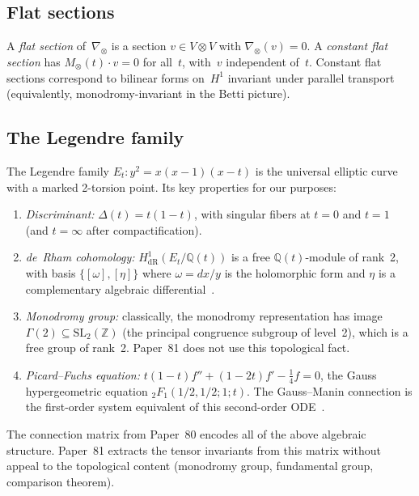 \documentclass[11pt]{article}
\theoremstyle{plain}
\theoremstyle{definition}
\theoremstyle{remark}
\newcommand{\Z}{\mathbb{Z}}
\newcommand{\Q}{\mathbb{Q}}
\newcommand{\HdR}{H^1_{\mathrm{dR}}}
\begin{document}
\subsection{Flat sections}

A \emph{flat section} of~$\nabla_{\otimes}$ is a section
$v \in V \otimes V$ with $\nabla_{\otimes}(v) = 0$.
A \emph{constant flat section} has
$M_{\otimes}(t) \cdot v = 0$ for all~$t$, with~$v$
independent of~$t$.  Constant flat sections correspond to
bilinear forms on~$H^1$ invariant under parallel transport
(equivalently, monodromy-invariant in the Betti picture).

\subsection{The Legendre family}\label{sec:legendre}

The Legendre family $E_t : y^2 = x(x-1)(x-t)$ is the
universal elliptic curve with a marked 2-torsion point.
Its key properties for our purposes:
\begin{enumerate}[nosep]
\item \emph{Discriminant:} $\Delta(t) = t(1-t)$, with
  singular fibers at $t = 0$ and $t = 1$ (and $t = \infty$
  after compactification).
\item \emph{de~Rham cohomology:} $\HdR(E_t/\Q(t))$ is
  a free $\Q(t)$-module of rank~2, with basis
  $\{[\omega], [\eta]\}$ where $\omega = dx/y$ is the
  holomorphic form and $\eta$ is a complementary algebraic
  differential~\cite{Paper80}.
\item \emph{Monodromy group:} classically, the monodromy
  representation has image $\Gamma(2) \subseteq \mathrm{SL}_2(\Z)$
  (the principal congruence subgroup of level~2), which is
  a free group of rank~2.  Paper~81 does not use this
  topological fact.
\item \emph{Picard--Fuchs equation:}
  $t(1-t) f'' + (1-2t) f' - \frac{1}{4} f = 0$,
  the Gauss hypergeometric equation ${}_2F_1(1/2, 1/2; 1; t)$.
  The Gauss--Manin connection is the first-order system
  equivalent of this second-order ODE~\cite{Gauss1812,Katz1970}.
\end{enumerate}
The connection matrix from Paper~80 encodes all of the above
algebraic structure.  Paper~81 extracts the tensor invariants
from this matrix without appeal to the topological content
(monodromy group, fundamental group, comparison theorem).

\end{document}
